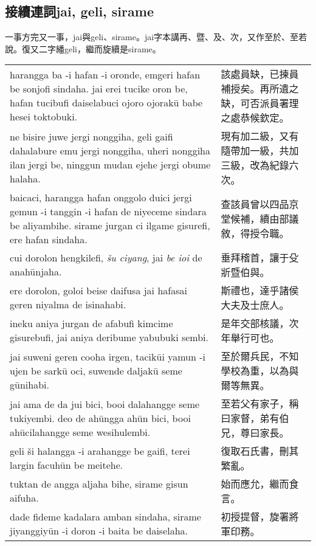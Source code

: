 \documentclass{article}
\begin{document}
\subsection{接續連詞jai, geli, sirame}
\noindent 一事方完又一事，jai與geli、sirame。jai字本講再、暨、及、次，又作至於、至若說。復又二字繙geli，繼而旋續是sirame。
\begin{center}
    \begin{tabularx}{\textwidth}{XX}
        harangga ba -i hafan -i oronde, emgeri hafan be sonjofi sindaha. jai erei tucike oron be, hafan tucibufi daiselabuci ojoro ojorak\={u} babe hesei toktobuki. & 該處員缺，已揀員補授矣。再所遺之缺，可否派員署理之處恭候欽定。\\
        ne bisire juwe jergi nonggiha, geli gaifi dahalabure emu jergi nonggiha, uheri nonggiha ilan jergi be, ninggun mudan ejehe jergi obume halaha. & 現有加二級，又有隨帶加一級，共加三級，改為紀錄六次。\\
        baicaci, harangga hafan onggolo duici jergi gemun -i tanggin -i hafan de niyeceme sindara be aliyambihe. sirame jurgan ci ilgame gisurefi, ere hafan sindaha. & 查該員曾以四品京堂候補，續由部議敘，得授令職。\\
        cui dorolon hengkilefi, \emph{\v{s}u ciyang}, jai \emph{be ioi} de anah\={u}njaha. & 垂拜稽首，讓于殳斨暨伯與。\\
        ere dorolon, goloi beise daifusa jai hafasai geren niyalma de isinahabi. &斯禮也，達乎諸侯大夫及士庶人。\\
        ineku aniya jurgan de afabufi kimcime gisurebufi, jai aniya deribume yabubuki sembi. & 是年交部核議，次年舉行可也。\\
        jai suweni geren cooha irgen, tacik\={u}i yamun -i ujen be sark\={u} oci, suwende daljak\={u} seme g\={u}nihabi. & 至於爾兵民，不知學校為重，以為與爾等無異。\\
        jai ama de da jui bici, booi dalahangge seme tukiyembi. deo de ah\={u}ngga ah\={u}n bici, booi ah\={u}cilahangge seme wesihulembi. &至若父有家子，稱曰家督，弟有伯兄，尊曰家長。\\
        geli \v{s}i halangga -i arahangge be gaifi, terei largin facuh\={u}n be meitehe. & 復取石氏書，刪其繁亂。\\
        tuktan de angga aljaha bihe, sirame gisun aifuha. & 始而應允，繼而食言。\\
        dade fideme kadalara amban sindaha, sirame jiyanggiy\={u}n -i doron -i baita be daiselaha. & 初授提督，旋署將軍印務。
    \end{tabularx}
\end{center}
\end{document}
